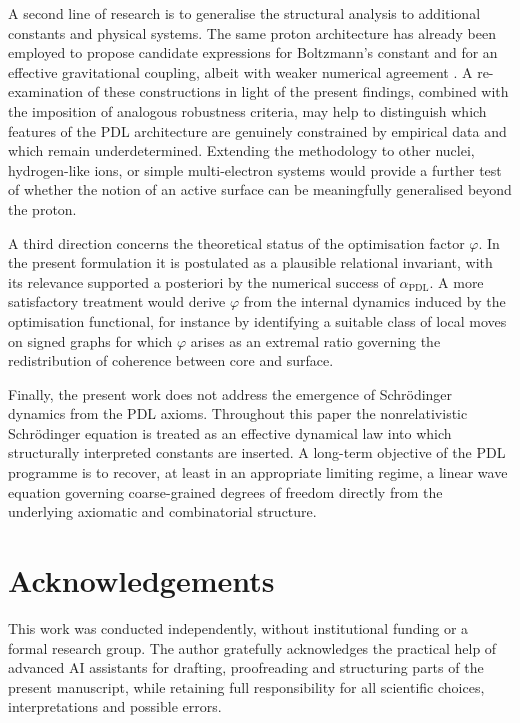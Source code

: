 \documentclass[11pt,a4paper]{article}
\theoremstyle{plain}
\theoremstyle{definition}
\theoremstyle{remark}
\begin{document}
A second line of research is to generalise the structural analysis to additional constants and physical systems. The same proton architecture has already been employed to propose candidate expressions for Boltzmann’s constant and for an effective gravitational coupling, albeit with weaker numerical agreement \cite{Laubscher2026PDL_English,Laubscher2026LDP_French}. A re-examination of these constructions in light of the present findings, combined with the imposition of analogous robustness criteria, may help to distinguish which features of the PDL architecture are genuinely constrained by empirical data and which remain underdetermined. Extending the methodology to other nuclei, hydrogen-like ions, or simple multi-electron systems would provide a further test of whether the notion of an active surface can be meaningfully generalised beyond the proton.

A third direction concerns the theoretical status of the optimisation factor \(\varphi\). In the present formulation it is postulated as a plausible relational invariant, with its relevance supported a posteriori by the numerical success of \(\alpha_{\mathrm{PDL}}\). A more satisfactory treatment would derive \(\varphi\) from the internal dynamics induced by the optimisation functional, for instance by identifying a suitable class of local moves on signed graphs for which \(\varphi\) arises as an extremal ratio governing the redistribution of coherence between core and surface.

Finally, the present work does not address the emergence of Schrödinger dynamics from the PDL axioms. Throughout this paper the nonrelativistic Schrödinger equation is treated as an effective dynamical law into which structurally interpreted constants are inserted. A long-term objective of the PDL programme is to recover, at least in an appropriate limiting regime, a linear wave equation governing coarse-grained degrees of freedom directly from the underlying axiomatic and combinatorial structure.

\section*{Acknowledgements}

This work was conducted independently, without institutional funding or a formal research group. The author gratefully acknowledges the practical help of advanced AI assistants for drafting, proofreading and structuring parts of the present manuscript, while retaining full responsibility for all scientific choices, interpretations and possible errors.


\end{document}
